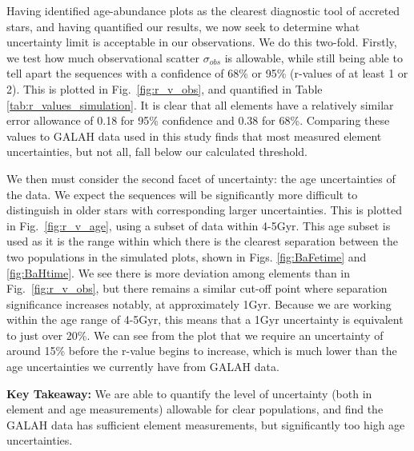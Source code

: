 \documentclass[fleqn,usenatbib]{mnras}
\begin{document}
Having identified age-abundance plots as the clearest diagnostic tool of accreted stars, and having quantified our results, we now seek to determine what uncertainty limit is acceptable in our observations. We do this two-fold. Firstly, we test how much observational scatter $\sigma_{obs}$ is allowable, while still being able to tell apart the sequences with a confidence of 68\% or 95\% (r-values of at least 1 or 2). This is plotted in Fig.~\ref{fig:r_v_obs}, and quantified in Table \ref{tab:r_values_simulation}. It is clear that all elements have a relatively similar error allowance of 0.18 for 95\% confidence and 0.38 for 68\%. Comparing these values to GALAH data used in this study finds that most measured element uncertainties, but not all, fall below our calculated threshold. \par  
We then must consider the second facet of uncertainty: the age uncertainties of the data. We expect the sequences will be significantly more difficult to distinguish in older stars with corresponding larger uncertainties. This is plotted in Fig.~\ref{fig:r_v_age}, using a subset of data within 4-5Gyr. This age subset is used as it is the range within which there is the clearest separation between the two populations in the simulated plots, shown in Figs. \ref{fig:BaFetime} and \ref{fig:BaHtime}. We see there is more deviation among elements than in Fig.~\ref{fig:r_v_obs}, but there remains a similar cut-off point where separation significance increases notably, at approximately 1Gyr. Because we are working within the age range of 4-5Gyr, this means that a 1Gyr uncertainty is equivalent to just over 20\%. We can see from the plot that we require an uncertainty of around 15\% before the r-value begins to increase, which is much lower than the age uncertainties we currently have from GALAH data. \par
\textbf{Key Takeaway:} We are able to quantify the level of uncertainty (both in element and age measurements) allowable for clear populations, and find the GALAH data has sufficient element measurements, but significantly too high age uncertainties. 



\end{document}
